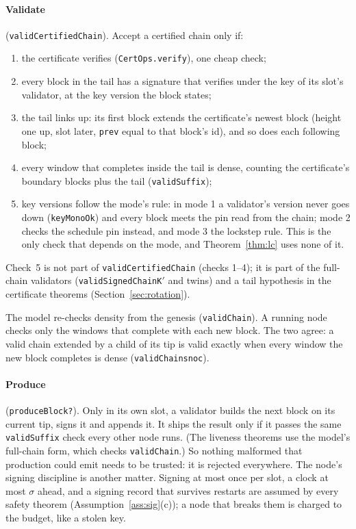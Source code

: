 \documentclass[10pt]{article}
\DeclareRobustCommand{\code}[1]{{\renewcommand{\_}{\textunderscore\allowbreak}\texttt{#1}}}
\begin{document}
\paragraph{Validate} (\code{validCertifiedChain}). Accept a certified
chain only if:
\begin{enumerate}
\item the certificate verifies (\code{CertOps.verify}), one cheap check;
\item every block in the tail has a signature that verifies under the key
  of its slot's validator, at the key version the block states;
\item the tail links up: its first block extends the certificate's
  newest block (height one up, slot later, \code{prev} equal to that
  block's id), and so does each following block;
\item every window that completes inside the tail is dense, counting the
  certificate's boundary blocks plus the tail (\code{validSuffix});
\item key versions follow the mode's rule: in mode 1 a validator's
  version never goes down (\code{keyMonoOk}) and every block meets the
  pin read from the chain; mode 2 checks the schedule pin instead, and
  mode 3 the lockstep rule. This is the only check that depends on the
  mode, and Theorem~\ref{thm:lc} uses none of it.
\end{enumerate}
Check~5 is not part of \code{validCertifiedChain} (checks 1--4); it is
part of the full-chain validators (\code{validSignedChainK$'$} and
twins) and a tail hypothesis in the certificate theorems
(Section~\ref{sec:rotation}).

The model re-checks density from the genesis (\code{validChain}). A
running node checks only the windows that complete with each new block.
The two agree: a valid chain extended by a child of its tip is valid
exactly when every window the new block completes is dense
(\code{validChain\_snoc}).

\paragraph{Produce} (\code{produceBlock?}). Only in its own slot, a
validator builds the next block on its current tip, signs it and appends
it. It ships the result only if it passes the same \code{validSuffix}
check every other node runs. (The liveness theorems use the model's
full-chain form, which checks \code{validChain}.) So nothing malformed that production could
emit needs to be trusted: it is rejected everywhere. The node's signing
discipline is another matter. Signing at most once per slot, a clock at
most $\sigma$ ahead, and a signing record that survives restarts are
assumed by every safety theorem (Assumption~\ref{ass:sig}(c)); a node
that breaks them is charged to the budget, like a stolen key.
\end{document}

